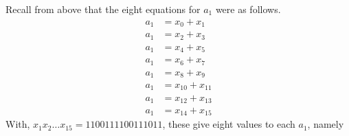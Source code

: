 \begin{enumerate}[label=(\roman*)]
\begin{comment}
	&= \octavec{disp(x_5)} + \octavec{disp(x_9)} + \octavec{disp(x_13)} + \octavec{disp(x_14)} + \octavec{disp(x_15)} = \octavec{disp(mod(x_5 + x_9+x_13+x_14+x_15,2))}\\
	a_0 &= x_6 + x_{10} + x_{13} + x_{14} + x_{15}\\
	&= \octavec{disp(x_6)} + 
	  \octavec{disp(x_10)} + 
	  \octavec{disp(x_13)} + 
	  \octavec{disp(x_14)} + 
	  \octavec{disp(x_15)} = 
	  \octavec{disp(mod(x_6 + x_10 + x_13 + x_14 + x_15,2))}\\
	a_0 &= x_5 + x_8 + x_{10} + x_{11} + x_{13} + x_{14} + x_{15},\\
	a_0 &= x_6 + x_{11} + x_{12} + x_{14} + x_{15}\\
	&= \octavec{disp(x_6)} + 
	  \octavec{disp(x_11)} + 
	  \octavec{disp(x_12)} + 
	  \octavec{disp(x_14)} + 
	  \octavec{disp(x_15)}
	   = \octavec{disp(mod(x_6 + x_11 + x_12 + x_14 + x_15,2))}\\
	a_0 &= x_3 + x_8 + x_{11} + x_{12} + x_{13} + x_{14} + x_{15}\\
	&= \octavec{disp(x_3)} + 
	  \octavec{disp(x_8)} + 
	  \octavec{disp(x_11)} + 
	  \octavec{disp(x_12)} + 
	  \octavec{disp(x_13)} +
	  \octavec{disp(x_14)} +
	  \octavec{disp(x_15)} 
	  = 
	  \octavec{disp(mod(x_3 + x_8 + x_11 + x_12 + x_13 + x_14 + x_15,2))}\\
	a_0 &= x_2 + x_8 + x_{10} + x_{12} + x_{13} + x_{14} + x_{15}\\
	&= \octavec{disp(x_2)} + 
	  \octavec{disp(x_8)} + 
	  \octavec{disp(x_10)} + 
	  \octavec{disp(x_12)} + 
	  \octavec{disp(x_13)} +
	  \octavec{disp(x_14)} +
	  \octavec{disp(x_15)} 
	  = 
	  \octavec{disp(mod(x_2 + x_8 + x_10 + x_12 + x_13 + x_14 + x_15,2))}\\
	a_0 &= x_0 + x_8 + x_9 + x_{10} + x_{11} + x_{12} + x_{13} + x_{14} + x_{15}\\
	&= \octavec{disp(x_0)} + 
	  \octavec{disp(x_8)} + 
	  \octavec{disp(x_9)} + 
	  \octavec{disp(x_10)} + 
	  \octavec{disp(x_11)} + 
	  \octavec{disp(x_12)} + 
	  \octavec{disp(x_13)} +
	  \octavec{disp(x_14)} +
	  \octavec{disp(x_15)} 
	  = 
	  \octavec{disp(mod(x_0 + x_8 + +x_9 +x_10 + x_11+ x_12 + x_13 + x_14 + x_15,2))}
\end{align*}
\end{comment}%

Recall from above that the eight equations for $a_1$ were as follows. 
\begin{align*}
	a_1 &= x_0 + x_1\\
	a_1 &= x_2 + x_3\\
	a_1 &= x_4 + x_5\\
	a_1 &= x_6 + x_7\\
	a_1 &= x_8 + x_9\\
	a_1 &= x_{10} + x_{11}\\
	a_1 &= x_{12} + x_{13}\\
	a_1 &= x_{14} + x_{15}
\end{align*}
With, $x_1x_2\ldots x_{15}=1100111100111011$, these give eight values to each $a_1$, namely


\end{enumerate}
